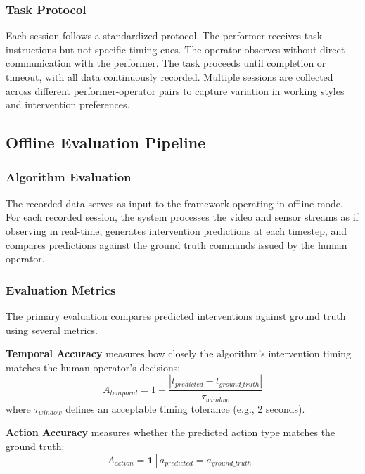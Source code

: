 \subsubsection{Task Protocol}

Each session follows a standardized protocol. The performer receives task instructions but not specific timing cues. The operator observes without direct communication with the performer. The task proceeds until completion or timeout, with all data continuously recorded. Multiple sessions are collected across different performer-operator pairs to capture variation in working styles and intervention preferences.

\subsection{Offline Evaluation Pipeline}

\subsubsection{Algorithm Evaluation}

The recorded data serves as input to the framework operating in offline mode. For each recorded session, the system processes the video and sensor streams as if observing in real-time, generates intervention predictions at each timestep, and compares predictions against the ground truth commands issued by the human operator.

\subsubsection{Evaluation Metrics}

The primary evaluation compares predicted interventions against ground truth using several metrics.

\textbf{Temporal Accuracy} measures how closely the algorithm's intervention timing matches the human operator's decisions:
\begin{equation}
    A_{temporal} = 1 - \frac{|t_{predicted} - t_{ground\_truth}|}{\tau_{window}}
\end{equation}
where $\tau_{window}$ defines an acceptable timing tolerance (e.g., 2 seconds).

\textbf{Action Accuracy} measures whether the predicted action type matches the ground truth:
\begin{equation}
    A_{action} = \mathbf{1}[a_{predicted} = a_{ground\_truth}]
\end{equation}

